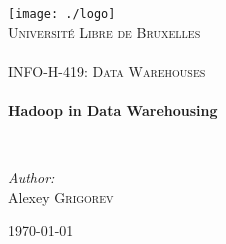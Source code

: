 \begin{titlepage}

\begin{titlepage}
\begin{center}

\texttt{[image: ./logo]}~\\[1cm]

\textsc{\LARGE Universit\'e Libre de Bruxelles}\\[1.5cm]

\ \\[1.5cm]

\textsc{\Large INFO-H-419: Data Warehouses}\\[0.5cm]

\HRule \\[0.4cm]
{ \huge \bfseries Hadoop in Data Warehousing \\[0.4cm] }

\HRule \\[1.5cm]



\begin{flushright} \large
\emph{Author:}\\
Alexey \textsc{Grigorev}
\end{flushright}

\vfill

{\large \today}

\end{center}
\end{titlepage}

\end{titlepage}
